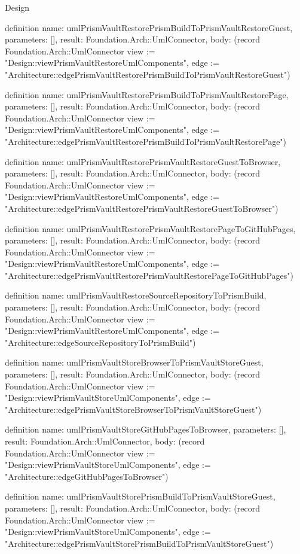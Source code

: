 \begin{lexlean}{Design}
\begin{semanticmodule}
definition{
  name: umlPrismVaultRestorePrismBuildToPrismVaultRestoreGuest,
  parameters: [],
  result: Foundation.Arch::UmlConnector,
  body: (record Foundation.Arch::UmlConnector {view := "Design::viewPrismVaultRestoreUmlComponents", edge := "Architecture::edgePrismVaultRestorePrismBuildToPrismVaultRestoreGuest"})
}

definition{
  name: umlPrismVaultRestorePrismBuildToPrismVaultRestorePage,
  parameters: [],
  result: Foundation.Arch::UmlConnector,
  body: (record Foundation.Arch::UmlConnector {view := "Design::viewPrismVaultRestoreUmlComponents", edge := "Architecture::edgePrismVaultRestorePrismBuildToPrismVaultRestorePage"})
}

definition{
  name: umlPrismVaultRestorePrismVaultRestoreGuestToBrowser,
  parameters: [],
  result: Foundation.Arch::UmlConnector,
  body: (record Foundation.Arch::UmlConnector {view := "Design::viewPrismVaultRestoreUmlComponents", edge := "Architecture::edgePrismVaultRestorePrismVaultRestoreGuestToBrowser"})
}

definition{
  name: umlPrismVaultRestorePrismVaultRestorePageToGitHubPages,
  parameters: [],
  result: Foundation.Arch::UmlConnector,
  body: (record Foundation.Arch::UmlConnector {view := "Design::viewPrismVaultRestoreUmlComponents", edge := "Architecture::edgePrismVaultRestorePrismVaultRestorePageToGitHubPages"})
}

definition{
  name: umlPrismVaultRestoreSourceRepositoryToPrismBuild,
  parameters: [],
  result: Foundation.Arch::UmlConnector,
  body: (record Foundation.Arch::UmlConnector {view := "Design::viewPrismVaultRestoreUmlComponents", edge := "Architecture::edgeSourceRepositoryToPrismBuild"})
}

definition{
  name: umlPrismVaultStoreBrowserToPrismVaultStoreGuest,
  parameters: [],
  result: Foundation.Arch::UmlConnector,
  body: (record Foundation.Arch::UmlConnector {view := "Design::viewPrismVaultStoreUmlComponents", edge := "Architecture::edgePrismVaultStoreBrowserToPrismVaultStoreGuest"})
}

definition{
  name: umlPrismVaultStoreGitHubPagesToBrowser,
  parameters: [],
  result: Foundation.Arch::UmlConnector,
  body: (record Foundation.Arch::UmlConnector {view := "Design::viewPrismVaultStoreUmlComponents", edge := "Architecture::edgeGitHubPagesToBrowser"})
}

definition{
  name: umlPrismVaultStorePrismBuildToPrismVaultStoreGuest,
  parameters: [],
  result: Foundation.Arch::UmlConnector,
  body: (record Foundation.Arch::UmlConnector {view := "Design::viewPrismVaultStoreUmlComponents", edge := "Architecture::edgePrismVaultStorePrismBuildToPrismVaultStoreGuest"})
}


\end{semanticmodule}
\end{lexlean}
